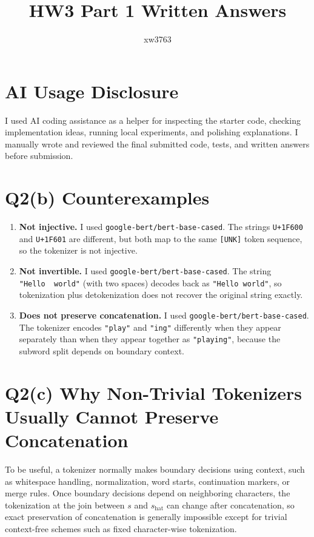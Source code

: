 \documentclass[11pt]{article}
\title{HW3 Part 1 Written Answers}
\author{xw3763}
\date{}
\begin{document}
\maketitle

\section*{AI Usage Disclosure}
I used AI coding assistance as a helper for inspecting the starter code, checking implementation ideas, running local experiments, and polishing explanations. I manually wrote and reviewed the final submitted code, tests, and written answers before submission.

\section*{Q2(b) Counterexamples}
\begin{enumerate}[label=\arabic*.]
    \item \textbf{Not injective.} I used \texttt{google-bert/bert-base-cased}. The strings \texttt{U+1F600} and \texttt{U+1F601} are different, but both map to the same \texttt{[UNK]} token sequence, so the tokenizer is not injective.
    \item \textbf{Not invertible.} I used \texttt{google-bert/bert-base-cased}. The string \texttt{"Hello\ \ world"} (with two spaces) decodes back as \texttt{"Hello world"}, so tokenization plus detokenization does not recover the original string exactly.
    \item \textbf{Does not preserve concatenation.} I used \texttt{google-bert/bert-base-cased}. The tokenizer encodes \texttt{"play"} and \texttt{"ing"} differently when they appear separately than when they appear together as \texttt{"playing"}, because the subword split depends on boundary context.
\end{enumerate}

\section*{Q2(c) Why Non-Trivial Tokenizers Usually Cannot Preserve Concatenation}
To be useful, a tokenizer normally makes boundary decisions using context, such as whitespace handling, normalization, word starts, continuation markers, or merge rules. Once boundary decisions depend on neighboring characters, the tokenization at the join between $s$ and $s_{\text{hat}}$ can change after concatenation, so exact preservation of concatenation is generally impossible except for trivial context-free schemes such as fixed character-wise tokenization.
\end{document}
